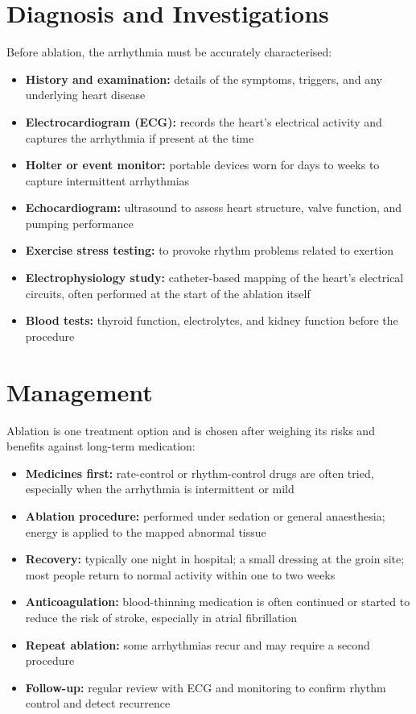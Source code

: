 \section*{Diagnosis and Investigations}
Before ablation, the arrhythmia must be accurately characterised:
\begin{itemize}
    \item \textbf{History and examination:} details of the symptoms, triggers, and any underlying heart disease
    \item \textbf{Electrocardiogram (ECG):} records the heart's electrical activity and captures the arrhythmia if present at the time
    \item \textbf{Holter or event monitor:} portable devices worn for days to weeks to capture intermittent arrhythmias
    \item \textbf{Echocardiogram:} ultrasound to assess heart structure, valve function, and pumping performance
    \item \textbf{Exercise stress testing:} to provoke rhythm problems related to exertion
    \item \textbf{Electrophysiology study:} catheter-based mapping of the heart's electrical circuits, often performed at the start of the ablation itself
    \item \textbf{Blood tests:} thyroid function, electrolytes, and kidney function before the procedure
\end{itemize}

\section*{Management}
Ablation is one treatment option and is chosen after weighing its risks and benefits against long-term medication:
\begin{itemize}
    \item \textbf{Medicines first:} rate-control or rhythm-control drugs are often tried, especially when the arrhythmia is intermittent or mild
    \item \textbf{Ablation procedure:} performed under sedation or general anaesthesia; energy is applied to the mapped abnormal tissue
    \item \textbf{Recovery:} typically one night in hospital; a small dressing at the groin site; most people return to normal activity within one to two weeks
    \item \textbf{Anticoagulation:} blood-thinning medication is often continued or started to reduce the risk of stroke, especially in atrial fibrillation
    \item \textbf{Repeat ablation:} some arrhythmias recur and may require a second procedure
    \item \textbf{Follow-up:} regular review with ECG and monitoring to confirm rhythm control and detect recurrence
\end{itemize}

